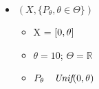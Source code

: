 \documentclass[11pt]{article}
\providecommand{\tightlist}{%
      \setlength{\itemsep}{0pt}\setlength{\parskip}{0pt}}
\begin{document}
\begin{itemize}
\tightlist
\item
  \((X,\{P_{\theta}, \theta \in \Theta\})\)

  \begin{itemize}
  \tightlist
  \vspace{10px}
  \item
    X = \([ 0,\space \theta]\)
    \vspace{5px}
  \item
    \(\theta = 10\); \(\Theta = \mathbb{R}\)
    \vspace{5px}
  \item
    \(P_{\theta} \textit{ ~ Unif}\space(0, \theta)\)
  \end{itemize}
\end{itemize}



    
    
    
\end{document}
